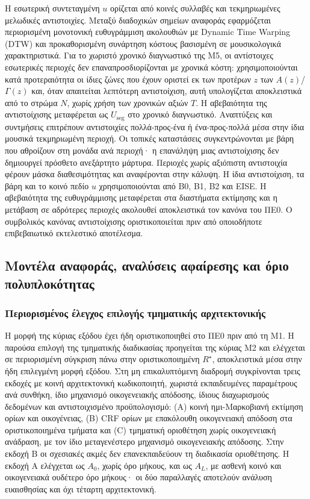 \documentclass[11pt,a4paper]{article}
\begin{document}
Η εσωτερική συντεταγμένη $u$ ορίζεται από κοινές συλλαβές και τεκμηριωμένες μελωδικές αντιστοιχίες. Μεταξύ διαδοχικών σημείων αναφοράς εφαρμόζεται περιορισμένη μονοτονική ευθυγράμμιση ακολουθιών με Dynamic Time Warping (DTW) και προκαθορισμένη συνάρτηση κόστους βασισμένη σε μουσικολογικά χαρακτηριστικά. Για το χωριστό χρονικό διαγνωστικό της M5, οι αντίστοιχες εσωτερικές περιοχές δεν επαναπροσδιορίζονται με χρονικά κόστη: χρησιμοποιούνται κατά προτεραιότητα οι ίδιες ζώνες που έχουν οριστεί εκ των προτέρων $z$ των $A(z)$/$\Gamma(z)$ και, όταν απαιτείται λεπτότερη αντιστοίχιση, αυτή υπολογίζεται αποκλειστικά από το στρώμα $N$, χωρίς χρήση των χρονικών αξιών $T$. Η αβεβαιότητα της αντιστοίχισης μεταφέρεται ως $U_{\mathrm{seg}}$ στο χρονικό διαγνωστικό. Αναπτύξεις και συντμήσεις επιτρέπουν αντιστοιχίες πολλά-προς-ένα ή ένα-προς-πολλά μέσα στην ίδια μουσικά τεκμηριωμένη περιοχή. Οι τοπικές καταστάσεις συγκεντρώνονται με βάρη που αθροίζουν στη μονάδα ανά περιοχή· η επανάληψη μιας αντιστοίχισης δεν δημιουργεί πρόσθετο ανεξάρτητο μάρτυρα. Περιοχές χωρίς αξιόπιστη αντιστοιχία φέρουν μάσκα διαθεσιμότητας και αναφέρονται στην κάλυψη. Η ίδια αντιστοίχιση, τα βάρη και το κοινό πεδίο $u$ χρησιμοποιούνται από B0, B1, B2 και EISE. Η αβεβαιότητα της ευθυγράμμισης μεταφέρεται στα διαστήματα εκτίμησης και η μετάβαση σε αδρότερες περιοχές ακολουθεί αποκλειστικά τον κανόνα του ΠΕ0. Ο συμβολικός κανόνας αντιστοίχισης οριστικοποιείται πριν από οποιοδήποτε επιβεβαιωτικό εκτελεστικό αποτέλεσμα.

\subsection{Μοντέλα αναφοράς, αναλύσεις αφαίρεσης και όριο πολυπλοκότητας}\label{app:eise-baselines}

\subsubsection{Περιορισμένος έλεγχος επιλογής τμηματικής αρχιτεκτονικής}\label{app:eise-model-selection}

Η μορφή της κύριας εξόδου έχει ήδη οριστικοποιηθεί στο ΠΕ0 πριν από τη M1. Η παρούσα επιλογή της τμηματικής διαδικασίας προηγείται της κύριας M2 και ελέγχεται σε περιορισμένη σύγκριση πάνω στην οριστικοποιημένη $R^\star$, αποκλειστικά μέσα στην ήδη επιλεγμένη μορφή εξόδου. Στη μη επικαλυπτόμενη διαδρομή συγκρίνονται τρεις εκδοχές με κοινή αρχιτεκτονική κωδικοποιητή, χωριστά εκπαιδευμένες παραμέτρους ανά συνθήκη, ίδιο μηχανισμό οικογενειακής απόδοσης, ίδιους διαχωρισμούς δεδομένων και αντιστοιχισμένο προϋπολογισμό: (A) κοινή ημι-Μαρκοβιανή εκτίμηση ορίων και οικογένειας, (B) CRF ορίων με επακόλουθη οικογενειακή απόδοση στα οριστικοποιημένα τμήματα και (C) τμηματική οριοθέτηση χωρίς οικογενειακή ανάδραση, με τον ίδιο μεταγενέστερο μηχανισμό οικογενειακής απόδοσης. Στην εκδοχή B οι σχεσιακές ακμές δεν επανεκπαιδεύουν τη διαδικασία οριοθέτησης. Η εκδοχή A ελέγχεται ως $A_0$, χωρίς όρο μήκους, και ως $A_L$, με ασθενή κοινό και οικογενειακά ουδέτερο όρο μήκους· οι δύο παραλλαγές αποτελούν ανάλυση ευαισθησίας και όχι τέταρτη αρχιτεκτονική.
\end{document}
